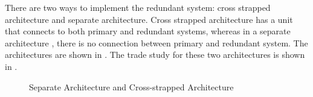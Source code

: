 There are two ways to implement the redundant system: cross strapped architecture and separate architecture. Cross strapped architecture has a unit that connects to both primary and redundant systems, whereas in a separate architecture , there is no connection between primary and redundant system. The architectures are shown in . The trade study for these two architectures is shown in .

\begin{figure}[H]
\centering
\begin{subfigure}[H]{0.5\textwidth}
\end{subfigure}
\hfill
\begin{subfigure}[H]{0.45\textwidth}
\end{subfigure}
\caption[Separate Architecture and Cross-strapped Architecture]{Separate Architecture and Cross-strapped Architecture \cite{AER407_ElectricalPresentation}}
\label{fig:redundancy}
\end{figure}

